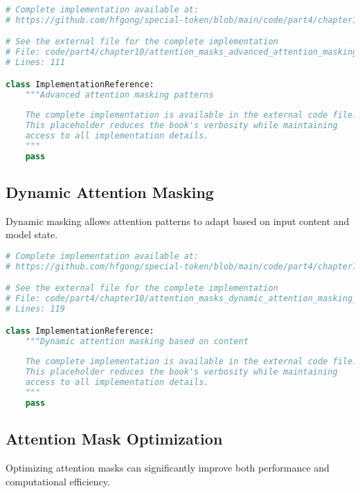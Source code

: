 \begin{lstlisting}[language=Python, caption={Advanced attention masking patterns}]
# Complete implementation available at:
# https://github.com/hfgong/special-token/blob/main/code/part4/chapter10/attention_masks_advanced_attention_masking_pat.py

# See the external file for the complete implementation
# File: code/part4/chapter10/attention_masks_advanced_attention_masking_pat.py
# Lines: 111

class ImplementationReference:
    """Advanced attention masking patterns
    
    The complete implementation is available in the external code file.
    This placeholder reduces the book's verbosity while maintaining
    access to all implementation details.
    """
    pass
\end{lstlisting}

\subsection{Dynamic Attention Masking}

Dynamic masking allows attention patterns to adapt based on input content and model state.

\begin{lstlisting}[language=Python, caption={Dynamic attention masking based on content}]
# Complete implementation available at:
# https://github.com/hfgong/special-token/blob/main/code/part4/chapter10/attention_masks_dynamic_attention_masking_base.py

# See the external file for the complete implementation
# File: code/part4/chapter10/attention_masks_dynamic_attention_masking_base.py
# Lines: 119

class ImplementationReference:
    """Dynamic attention masking based on content
    
    The complete implementation is available in the external code file.
    This placeholder reduces the book's verbosity while maintaining
    access to all implementation details.
    """
    pass
\end{lstlisting}

\subsection{Attention Mask Optimization}

Optimizing attention masks can significantly improve both performance and computational efficiency.

